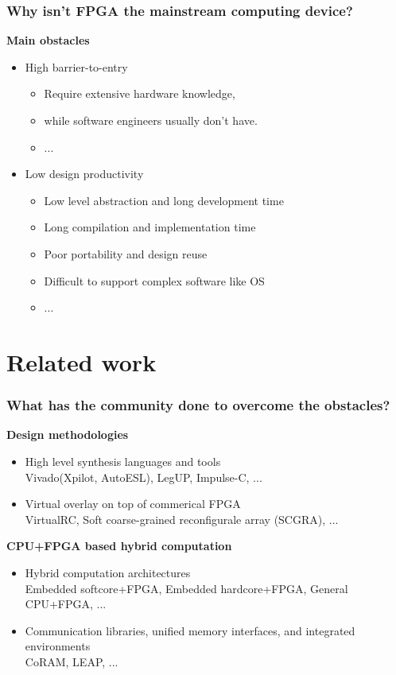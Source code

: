 \documentclass{beamer}
\begin{document}
\begin{frame}[t]

\frametitle{Why isn't FPGA the mainstream computing device?}
\textbf{Main obstacles}
\begin{itemize}

\item High barrier-to-entry
\begin{itemize}
\item Require extensive hardware knowledge,
\item while software engineers usually don't have.
\item ...
\end{itemize}

\item Low design productivity
\begin{itemize}
\item Low level abstraction and long development time
\item Long compilation and implementation time
\item Poor portability and design reuse
\item Difficult to support complex software like OS
\item ...
\end{itemize}

\end{itemize}

\end{frame}

\section{Related work}
\begin{frame}[t]
\frametitle{What has the community done to overcome the obstacles?}

\textbf{Design methodologies}
\begin{itemize}
\item High level synthesis languages and tools \\
\footnotesize
Vivado(Xpilot, AutoESL), LegUP, Impulse-C, ...
\normalsize
\item Virtual overlay on top of commerical FPGA \\
\footnotesize 
VirtualRC, Soft coarse-grained reconfigurale array (SCGRA), ...
\normalsize

\end{itemize}

\textbf{CPU+FPGA based hybrid computation}
\begin{itemize}
\item Hybrid computation architectures \\
\footnotesize
Embedded softcore+FPGA, Embedded hardcore+FPGA, General CPU+FPGA, ...
\normalsize
\item Communication libraries, unified memory interfaces, and integrated environments \\
\footnotesize
CoRAM, LEAP, ...
\normalsize
\end{itemize}

\end{frame}
\end{document}
